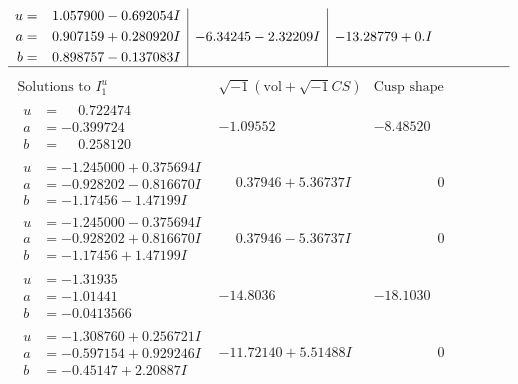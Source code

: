\documentclass[1p]{elsarticle_modified}
\theoremstyle{definition}
\newcommand{\I}{\sqrt{-1}}
\begin{document}
$$\begin{array}{c|c|c}
\begin{aligned}
u &= \phantom{-}1.057900 - 0.692054 I \\
a &= \phantom{-}0.907159 + 0.280920 I \\
b &= \phantom{-}0.898757 - 0.137083 I\end{aligned}
 & -6.34245 - 2.32209 I & -13.28779 + 0. I\phantom{ +0.000000I}\\
 \hline 
 \end{array}$$\newpage$$\begin{array}{c|c|c}  
\text{Solutions to }I^u_{1}& \I (\text{vol} + \sqrt{-1}CS) & \text{Cusp shape}\\
 \hline 
\begin{aligned}
u &= \phantom{-}0.722474\phantom{ +0.000000I} \\
a &= -0.399724\phantom{ +0.000000I} \\
b &= \phantom{-}0.258120\phantom{ +0.000000I}\end{aligned}
 & -1.09552\phantom{ +0.000000I} & -8.48520\phantom{ +0.000000I} \\ \hline\begin{aligned}
u &= -1.245000 + 0.375694 I \\
a &= -0.928202 - 0.816670 I \\
b &= -1.17456 - 1.47199 I\end{aligned}
 & \phantom{-}0.37946 + 5.36737 I & \phantom{-0.000000 } 0 \\ \hline\begin{aligned}
u &= -1.245000 - 0.375694 I \\
a &= -0.928202 + 0.816670 I \\
b &= -1.17456 + 1.47199 I\end{aligned}
 & \phantom{-}0.37946 - 5.36737 I & \phantom{-0.000000 } 0 \\ \hline\begin{aligned}
u &= -1.31935\phantom{ +0.000000I} \\
a &= -1.01441\phantom{ +0.000000I} \\
b &= -0.0413566\phantom{ +0.000000I}\end{aligned}
 & -14.8036\phantom{ +0.000000I} & -18.1030\phantom{ +0.000000I} \\ \hline\begin{aligned}
u &= -1.308760 + 0.256721 I \\
a &= -0.597154 + 0.929246 I \\
b &= -0.45147 + 2.20887 I\end{aligned}
 & -11.72140 + 5.51488 I & \phantom{-0.000000 } 0 \\ \hline\begin{aligned}

\end{aligned}
\end{array}$$
\end{document}

